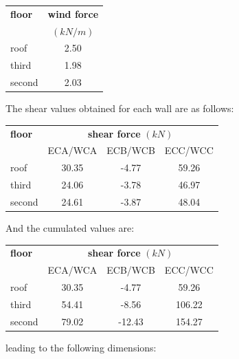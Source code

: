 \begin{center}
  \begin{tabular}{|l|c|}
    \hline
    \textbf{floor} & \textbf{wind force}\\
    & $(kN/m)$\\
    \hline
    roof & 2.50 \\
    third & 1.98 \\
    second & 2.03 \\
    \hline
  \end{tabular}
\end{center}  

\noindent The shear values obtained for each wall are as follows:

\begin{center}
  \begin{tabular}{|l|c|c|c|}
    \hline
    \textbf{floor} & \multicolumn{3}{c|}{\textbf{shear force} $(kN)$}\\
                   & ECA/WCA & ECB/WCB & ECC/WCC \\
    \hline
    roof & 30.35 & -4.77 & 59.26 \\
    third & 24.06 & -3.78 & 46.97 \\
    second & 24.61 & -3.87 & 48.04 \\
    \hline
  \end{tabular}
\end{center}  

\noindent And the cumulated values are:

\begin{center}
  \begin{tabular}{|l|c|c|c|}
    \hline
    \textbf{floor} & \multicolumn{3}{c|}{\textbf{shear force} $(kN)$}\\
                   & ECA/WCA & ECB/WCB & ECC/WCC \\
    \hline
roof & 30.35 & -4.77 & 59.26 \\
third & 54.41 & -8.56 & 106.22 \\
second & 79.02 & -12.43 & 154.27 \\
    \hline
  \end{tabular}
\end{center}

\noindent leading to the following dimensions:

